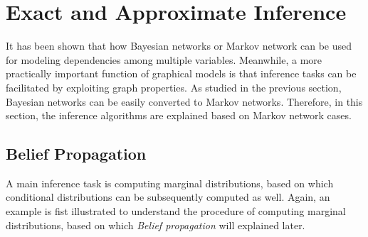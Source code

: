 \section{Exact and Approximate Inference}
\label{sec:inference}
It has been shown that how Bayesian networks or Markov network can be used for modeling dependencies among multiple variables. Meanwhile, a more practically important 
function of graphical models is that inference tasks can be facilitated by exploiting graph properties.           
As studied in the previous section, Bayesian networks can be easily converted to Markov networks. Therefore, in this section, the inference algorithms are explained based on 
Markov network cases.   
\subsection{Belief Propagation}
A main inference task is computing marginal distributions, based on which conditional distributions can be subsequently computed as well.    
Again, an example is fist illustrated to understand the procedure of computing marginal distributions, based on which \emph{Belief propagation} will explained  
later. 

